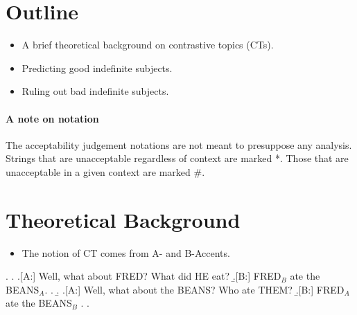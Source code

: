 \documentclass[letterpaper]{article}
\begin{document}
\section{Outline}
\begin{itemize}
  \item A brief theoretical background on contrastive topics (CTs).
  \item Predicting good indefinite subjects.
  \item Ruling out bad indefinite subjects.
\end{itemize}
\paragraph{A note on notation}
The acceptability judgement notations are not meant to presuppose any analysis.
Strings that are unacceptable regardless of context are marked *.
Those that are unacceptable in a given context are marked \#.
\section{Theoretical Background}
\begin{itemize}
  \item The notion of CT comes from  A- and B-Accents.
\end{itemize}
\ex.
\a.
\a.[A:] Well, what about FRED? What did HE eat?
\b.[B:] FRED$_B$ ate the BEANS$_A$.
\z.
\b.
\a.[A:] Well, what about the BEANS? Who ate THEM?
\b.[B:] FRED$_A$ ate the BEANS$_B$
\z.
\z.
\end{document}
